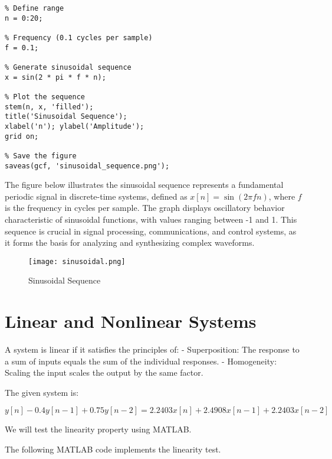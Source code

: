 \documentclass[a4paper,12pt]{article}
\begin{document}
\begin{verbatim}
% Define range
n = 0:20;  

% Frequency (0.1 cycles per sample)
f = 0.1;  

% Generate sinusoidal sequence
x = sin(2 * pi * f * n);

% Plot the sequence
stem(n, x, 'filled');
title('Sinusoidal Sequence');
xlabel('n'); ylabel('Amplitude');
grid on;

% Save the figure
saveas(gcf, 'sinusoidal_sequence.png');
\end{verbatim}

The figure below illustrates the  sinusoidal sequence represents a fundamental periodic signal in discrete-time systems, defined as \( x[n] = \sin(2\pi f n) \), where \( f \) is the frequency in cycles per sample. The graph displays oscillatory behavior characteristic of sinusoidal functions, with values ranging between -1 and 1. This sequence is crucial in signal processing, communications, and control systems, as it forms the basis for analyzing and synthesizing complex waveforms.


\begin{figure}[H]
    \centering
    \texttt{[image: sinusoidal.png]}
    \caption{Sinusoidal Sequence}
    \label{fig:sinusoidal}
\end{figure}


\section{ Linear and Nonlinear Systems } 
A system is linear if it satisfies the principles of:
- Superposition: The response to a sum of inputs equals the sum of the individual responses.
- Homogeneity: Scaling the input scales the output by the same factor.

The given system is:

\[
y[n] - 0.4y[n - 1] + 0.75y[n - 2] = 2.2403x[n] + 2.4908x[n - 1] + 2.2403x[n - 2]
\]

We will test the linearity property using MATLAB.

The following MATLAB code implements the linearity test.
\end{document}
